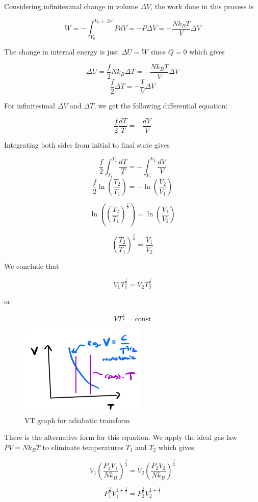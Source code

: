 Considering infinitesimal change in volume $\Delta V$, the work done in this process is

\[W=-\int_{V_0}^{V_0+\Delta V} PdV=-P\Delta V=-\frac{Nk_BT}{V} \Delta V\]

The change in internal energy is just $\Delta U=W$ since $Q=0$ which gives

\[\Delta U=\frac{f}{2}Nk_B\Delta T=-\frac{Nk_BT}{V} \Delta V\]
\[\frac{f}{2}\Delta T=-\frac{T}{V}\Delta V\]

For infinitesimal $\Delta V$ and $\Delta T$, we get the following differential equation:

\[\frac{f}{2}\frac{dT}{T}=-\frac{dV}{V}\]

Integrating both sides from initial to final state gives

\[\frac{f}{2}\int_{T_1}^{T_2}\frac{dT}{T}=-\int_{V_1}^{V_2}\frac{dV}{V}\]
\[\frac{f}{2}\ln\left(\frac{T_2}{T_1}\right)=-\ln\left(\frac{V_2}{V_1}\right)\]

\[\ln\left( \left(\frac{T_2}{T_1}\right)^{\frac{f}{2}} \right)=\ln\left(\frac{V_1}{V_2}\right)\]

\[ \left(\frac{T_2}{T_1}\right)^{\frac{f}{2}}=\frac{V_1}{V_2} \]

We conclude that

\[V_1T_1^\frac{f}{2}=V_2T_2^\frac{f}{2}\]

or

\[VT^\frac{f}{2}=\text{const}\]

\begin{figure}[H]
	\centering
	\includegraphics[width=60mm]{30.png}
	\caption{VT graph for adiabatic transform}
\end{figure}

There is the alternative form for this equation. We apply the ideal gas law $PV=Nk_BT$ to eliminate temperatures $T_1$ and $T_2$ which gives

\[V_1\left(\frac{P_1V_1}{Nk_B}\right)^\frac{f}{2}=V_2\left(\frac{P_2V_2}{Nk_B}\right)^\frac{f}{2}\]

\[P_1^\frac{f}{2} V_1^{1+\frac{f}{2}}=P_2^\frac{f}{2} V_2^{1+\frac{f}{2}}\]

